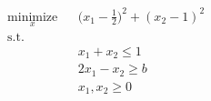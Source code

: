 \begin{equation*}
\begin{aligned}
    & \underset{x}{\text{minimize}} & & \biggl(x_1-\frac{1}{2} \biggr)^2 + (x_2 - 1)^2 \\
    &\text{s.t.} \\
    &&&  x_1 + x_2 \leq 1 \\
    &&&  2x_1 - x_2 \geq b \\
    &&&  x_1, x_2 \geq 0
\end{aligned}
\end{equation*}
